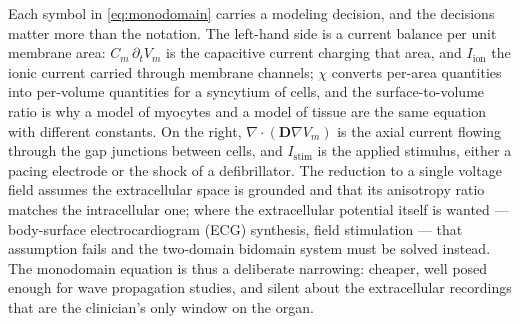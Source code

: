 Each symbol in \eqref{eq:monodomain} carries a modeling decision, and the
decisions matter more than the notation. The left-hand side is a current balance
per unit membrane area: $C_m\,\partial_t V_m$ is the capacitive current charging
that area, and $I_{\text{ion}}$ the ionic current carried through membrane
channels; $\chi$ converts per-area quantities into per-volume quantities for a
syncytium of cells, and the surface-to-volume ratio is why a model of myocytes
and a model of tissue are the same equation with different constants. On the
right, $\nabla\cdot(\mathbf{D}\nabla V_m)$ is the axial current flowing through
the gap junctions between cells, and $I_{\text{stim}}$ is the applied stimulus,
either a pacing electrode or the shock of a defibrillator. The reduction to a
single voltage field assumes the extracellular space is grounded and that its
anisotropy ratio matches the intracellular one; where the extracellular
potential itself is wanted --- body-surface electrocardiogram (ECG) synthesis,
field stimulation --- that assumption fails and the two-domain bidomain system
must be solved instead.
The monodomain equation is thus a deliberate narrowing: cheaper, well posed
enough for wave propagation studies, and silent about the extracellular
recordings that are the clinician's only window on the organ.

